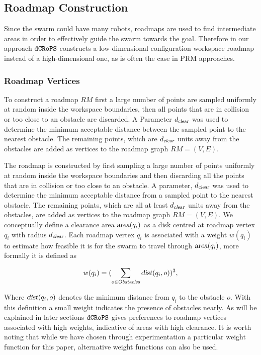 \documentclass[letterpaper, 10pt, conference]{ieeeconf}
\newcommand{\Acronym}[1]{\ensuremath{{\small{\texttt{#1}}}}}
\newcommand{\Var}[1]{\ensuremath{{\small{\textsl{#1}}}}}
\newcommand{\Name}{\Acronym{dCRoPS}}
\begin{document}
\subsection{Roadmap Construction}
\label{sec:RM}

Since the swarm could have many robots, roadmaps are used to find intermediate
areas in order to effectively guide the swarm towards the goal. Therefore in
our approach $\Name$ constructs a low-dimensional configuration workspace
roadmap instead of a high-dimensional one, as is often the case in PRM
approaches.


\subsubsection{Roadmap Vertices}

To construct a roadmap $RM$ first a large number of points are sampled
uniformly at random inside the workspace boundaries, then all points that are
in collision or too close to an obstacle are discarded. A Parameter
$d_\Var{clear}$ was used to determine the minimum acceptable distance between
the sampled point to the nearest obstacle. The remaining points, which are
$d_\Var{clear}$ units away from the obstacles are added as vertices to the
roadmap graph $RM = (V, E)$.

The roadmap is constructed by first sampling a large number of points uniformly
at random inside the workspace boundaries and then discarding all the points
that are in collision or too close to an obstacle. A parameter, $d_\Var{clear}$
was used to determine the minimum acceptable distance from a sampled point to
the nearest obstacle. The remaining points, which are all at least
$d_\Var{clear}$ units away from the obstacles, are added as vertices to the
roadmap graph $RM = (V, E)$. We conceptually define a clearance area
$\Var{area}(q_i)$ as a disk centred at roadmap vertex $q_i$ with radius
$d_\Var{clear}$. Each roadmap vertex $q_i$ is associated with a weight $w(q_i)$
to estimate how feasible it is for the swarm to travel through
$\Var{area}(q_i)$, more formally it is defined as

$$ w(q_i) = (\sum_{o \in\Var{Obstacles}} \Var{dist}(q_i, o))^3, $$

Where $\Var{dist}(q_i, o)$ denotes the minimum distance from $q_i$ to the
obstacle $o$. With this definition a small weight indicates the presence of
obstacles nearly. As will be explained in later sections $\Name$ gives
preferences to roadmap vertices associated with high weights, indicative of
areas with high clearance. It is worth noting that while we have chosen through
experimentation a particular weight function for this paper, alternative weight
functions can also be used.
\end{document}
